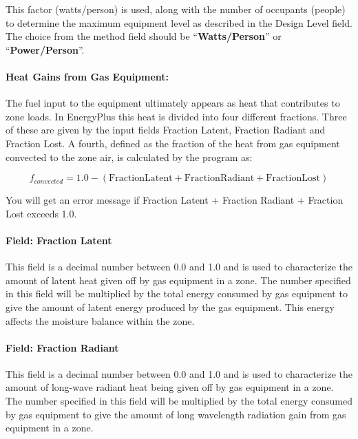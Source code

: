 This factor (watts/person) is used, along with the number of occupants (people) to determine the maximum equipment level as described in the Design Level field. The choice from the method field should be ``\textbf{Watts/Person}'' or ``\textbf{Power/Person}''.

\paragraph{Heat Gains from Gas Equipment:}\label{heat-gains-from-gas-equipment-gas-definition}

The fuel input to the equipment ultimately appears as heat that contributes to zone loads. In EnergyPlus this heat is divided into four different fractions. Three of these are given by the input fields Fraction Latent, Fraction Radiant and Fraction Lost. A fourth, defined as the fraction of the heat from gas equipment convected to the zone air, is calculated by the program as:

\begin{equation}
  f_{convected} = 1.0 - (\mathrm{Fraction Latent} + \mathrm{Fraction Radiant} + \mathrm{Fraction Lost})
\end{equation}

You will get an error message if Fraction Latent + Fraction Radiant + Fraction Lost exceeds 1.0.

\paragraph{Field: Fraction Latent}\label{field-fraction-latent-1-gas-definition}

This field is a decimal number between 0.0 and 1.0 and is used to characterize the amount of latent heat given off by gas equipment in a zone. The number specified in this field will be multiplied by the total energy consumed by gas equipment to give the amount of latent energy produced by the gas equipment. This energy affects the moisture balance within the zone.

\paragraph{Field: Fraction Radiant}\label{field-fraction-radiant-3-gas-definition}

This field is a decimal number between 0.0 and 1.0 and is used to characterize the amount of long-wave radiant heat being given off by gas equipment in a zone. The number specified in this field will be multiplied by the total energy consumed by gas equipment to give the amount of long wavelength radiation gain from gas equipment in a zone.

